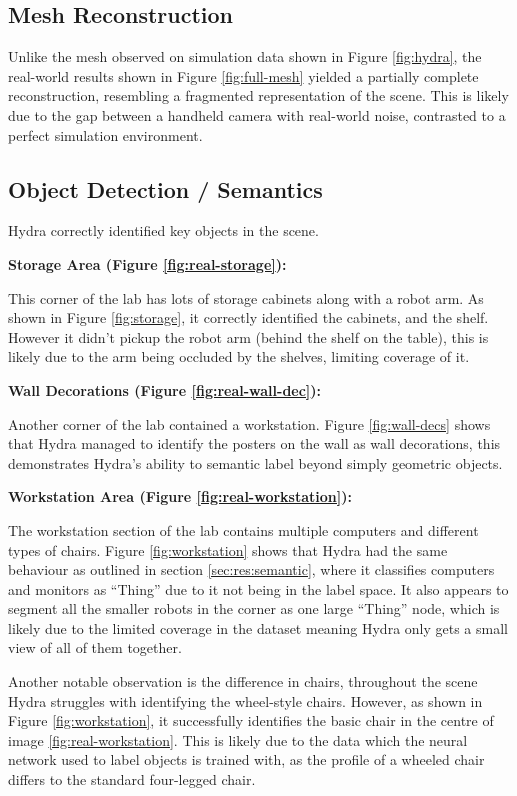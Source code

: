 \subsection{Mesh Reconstruction}\label{subsec:real-mesh}
Unlike the mesh observed on simulation data shown in Figure \ref{fig:hydra}, the real-world results shown in Figure \ref{fig:full-mesh} yielded a partially complete reconstruction, resembling a fragmented representation of the scene. This is likely due to the gap between a handheld camera with real-world noise, contrasted to a perfect simulation environment.

\subsection{Object Detection / Semantics}\label{subsec:real-object-detection}
Hydra correctly identified key objects in the scene.

\noindent \textbf{Storage Area (Figure \ref{fig:real-storage}):}

This corner of the lab has lots of storage cabinets along with a robot arm. As shown in Figure \ref{fig:storage}, it correctly identified the cabinets, and the shelf. However it didn’t pickup the robot arm (behind the shelf on the table), this is likely due to the arm being occluded by the shelves, limiting coverage of it.

\noindent \textbf{Wall Decorations (Figure \ref{fig:real-wall-dec}):}

Another corner of the lab contained a workstation. Figure \ref{fig:wall-decs} shows that Hydra managed to identify the posters on the wall as wall decorations, this demonstrates Hydra’s ability to semantic label beyond simply geometric objects.

\noindent \textbf{Workstation Area (Figure \ref{fig:real-workstation}):}

The workstation section of the lab contains multiple computers and different types of chairs. Figure \ref{fig:workstation} shows that Hydra had the same behaviour as outlined in section \ref{sec:res:semantic}, where it classifies computers and monitors as “Thing” due to it not being in the label space. It also appears to segment all the smaller robots in the corner as one large “Thing” node, which is likely due to the limited coverage in the dataset meaning Hydra only gets a small view of all of them together.

Another notable observation is the difference in chairs, throughout the scene Hydra struggles with identifying the wheel-style chairs. However, as shown in Figure \ref{fig:workstation}, it successfully identifies the basic chair in the centre of image \ref{fig:real-workstation}. This is likely due to the data which the neural network used to label objects is trained with, as the profile of a wheeled chair differs to the standard four-legged chair.

